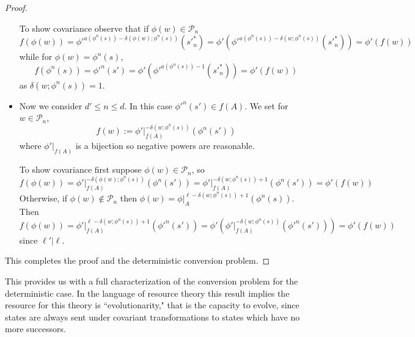 \begin{proof}
\begin{itemize}
        To show covariance observe that if $\phi(w) \in \mathcal{P}_n$
        \begin{equation*}
            f(\phi(w)) = {\phi'}^{a(\phi^n(s))-\delta(\phi(w);\phi^n(s))}({s'}_n^*) = \phi'({\phi'}^{a(\phi^n(s))-\delta(w;\phi^n(s))}({s'}_n^*)) = \phi'(f(w))
        \end{equation*}
        while for $\phi(w) = \phi^n(s)$, 
        \begin{equation*}
            f(\phi^n(s)) = {\phi'}^n(s') = \phi'({\phi'}^{a(\phi^n(s))-1}({s'}_n^*)) = \phi'(f(w))
        \end{equation*}
        as $\delta(w;\phi^n(s)) = 1$.
        \item Now we consider $d' \leq n \leq d$. In this case ${\phi'}^n(s') \in f(A)$. We set for $w \in \mathcal{P}_n$, 
        \begin{equation*}
            f(w) := \phi'\vert_{f(A)}^{-\delta(w;\phi^n(s))}(\phi^n(s'))
        \end{equation*}
        where $\phi'\vert_{f(A)}$ is a bijection so negative powers are reasonable.

        To show covariance first suppose $\phi(w) \in \mathcal{P}_n$, so 
        \begin{equation*}
            f(\phi(w)) = \phi'\vert_{f(A)}^{-\delta(\phi(w);\phi^n(s))}(\phi^n(s')) =\phi'\vert_{f(A)}^{-\delta(w;\phi^n(s))+1}(\phi^n(s')) = \phi'(f(w))
        \end{equation*}
        Otherwise, if $\phi(w) \notin \mathcal{P}_n$ then $\phi(w) = \phi\vert_{A}^{\ell-\delta(w;\phi^n(s))+1}(\phi^n(s))$. Then 
        \begin{equation*}
            f(\phi(w)) = \phi'\vert_{f(A)}^{\ell-\delta(w;\phi^n(s))+1}({\phi'}^n(s')) = \phi'(\phi'\vert_{f(A)}^{-\delta(w;\phi^n(s))}({\phi'}^n(s'))) = \phi'(f(w))
        \end{equation*}
        since $\ell'\vert \ell$.
    \end{itemize}
    This completes the proof and the deterministic conversion problem.
\end{proof}

This provides us with a full characterization of the conversion problem for the deterministic case. In the language of resource theory this result implies the resource for this theory is ``evolutionarity," that is the capacity to evolve, since states are always sent under covariant transformations to states which have no more successors.


